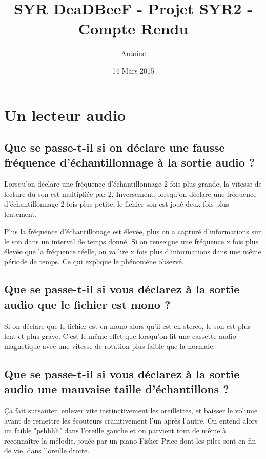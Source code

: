 \documentclass[a4paper,10pt,openany,oneside]{report}
\title{SYR DeaDBeeF - Projet SYR2 - Compte Rendu}
\author{Antoine \bsc{Pinsard}}
\date{14 Mars 2015}
\begin{document}
\maketitle

\section{Un lecteur audio}

\subsection{Que se passe-t-il si on déclare une fausse fréquence
            d'échantillonnage à la sortie audio ?}

Lorsqu'on déclare une fréquence d'échantillonnage 2 fois plus grande, la
vitesse de lecture du son est multipliée par 2. Inversement, lorsqu'on déclare
une fréquence d'échantillonnage 2 fois plus petite, le fichier son est joué
deux fois plus lentement.

Plus la fréquence d'échantillonage est élevée, plus on a capturé d'informations
sur le son dans un interval de temps donné. Si on renseigne une fréquence x
fois plus élevée que la fréquence réelle, on va lire x fois plus d'informations
dans une même période de temps. Ce qui explique le phénomène observé.

\subsection{Que se passe-t-il si vous déclarez à la sortie audio que le fichier
            est mono ?}

Si on déclare que le fichier est en mono alors qu'il est en stereo, le son est
plus lent et plus grave. C'est le même effet que lorsqu'on lit une cassette
audio magnetique avec une vitesse de rotation plus faible que la normale.

\subsection{Que se passe-t-il si vous déclarez à la sortie audio une mauvaise
            taille d'échantillons ?}

Ça fait sursauter, enlever vite instinctivement les oreillettes, et baisser le
volume avant de remettre les écouteurs craintivement l'un après l'autre. On
entend alors un faible "pshhhh" dans l'oreille gauche et on parvient tout de
même à reconnaître la mélodie, jouée par un piano Fisher-Price dont les piles
sont en fin de vie, dans l'oreille droite.
\end{document}
